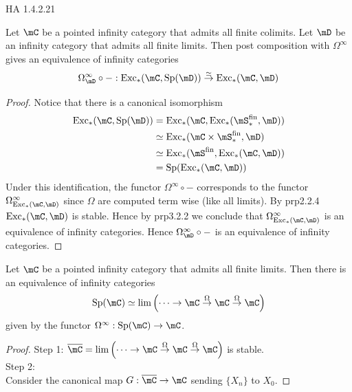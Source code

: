 \documentclass[a4paper]{article}
\begin{document}
HA 1.4.2.21

\begin{prp}{}{} Let $\mC$ be a pointed infinity category that admits all finite colimits. Let $\mD$ be an infinity category that admits all finite limits. Then post composition with $\Omega^\infty$ gives an equivalence of infinity categories $$\Omega_\mD^\infty\circ-:\text{Exc}_\ast(\mC,\text{Sp}(\mD))\overset{\simeq}{\rightarrow}\text{Exc}_\ast(\mC,\mD)$$ 
\begin{proof}
Notice that there is a canonical isomorphism 
\begin{align*}
\text{Exc}_\ast(\mC,\text{Sp}(\mD))&=\text{Exc}_\ast(\mC,\text{Exc}_\ast(\mS_\ast^\text{fin},\mD))\\
&\simeq\text{Exc}_\ast(\mC\times\mS_\ast^\text{fin},\mD)\\
&\simeq\text{Exc}_\ast(\mS^\text{fin},\text{Exc}_\ast(\mC,\mD))\\
&=\text{Sp}(\text{Exc}_\ast(\mC,\mD))
\end{align*}
Under this identification, the functor $\Omega^\infty\circ -$ corresponds to the functor $\Omega_{\text{Exc}_\ast(\mC,\mD)}^\infty$ since $\Omega$ are computed term wise (like all limits). By prp2.2.4 $\text{Exc}_\ast(\mC,\mD)$ is stable. Hence by prp3.2.2 we conclude that $\Omega_{\text{Exc}_\ast(\mC,\mD)}^\infty$ is an equivalence of infinity categories. Hence $\Omega_\mD^\infty\circ-$ is an equivalence of infinity categories. 
\end{proof}
\end{prp}

\begin{prp}{}{} Let $\mC$ be a pointed infinity category that admits all finite limits. Then there is an equivalence of infinity categories $$\text{Sp}(\mC)\simeq\lim\left(\cdots\rightarrow\mC\overset{\Omega}{\rightarrow}\mC\overset{\Omega}{\rightarrow}\mC\right)$$ given by the functor $\Omega^\infty:\text{Sp}(\mC)\to\mC$. 
\begin{proof}
Step 1: $\overline{\mC}=\lim\left(\cdots\rightarrow\mC\overset{\Omega}{\rightarrow}\mC\overset{\Omega}{\rightarrow}\mC\right)$ is stable. \\

Step 2: \\
Consider the canonical map $G:\overline{\mC}\to\mC$ sending $\{X_n\}$ to $X_0$. 
\end{proof}
\end{prp}
\end{document}

